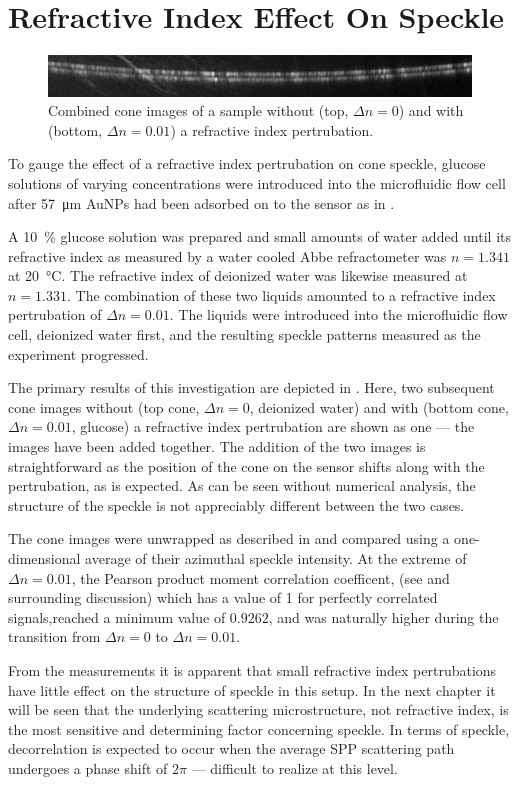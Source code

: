 \section{Refractive Index Effect On Speckle}
\begin{figure}[ht]
\centering
\includegraphics[keepaspectratio,width=15cm]{bulkri/figures/combineri.png}
\caption{Combined cone images of a sample without (top, $\Delta n = 0$) and
with (bottom, $\Delta n = 0.01$) a refractive index pertrubation. }
\label{fig:speckleridrangos}
\end{figure}

To gauge the effect of a refractive index pertrubation on cone speckle,
glucose solutions of varying concentrations were introduced into the
microfluidic flow cell after \SI{57}{\micro\meter} AuNPs had been adsorbed on
to the sensor as in .

A \SI{10}{\percent} glucose solution was prepared and small amounts of water
added until its refractive index as measured by a water cooled Abbe
refractometer was $n=1.341$ at \SI{20}{\celsius}.  The refractive index of
deionized water was likewise measured at $n=1.331$.  The combination of these
two liquids amounted to a refractive index pertrubation of $\Delta n = 0.01$.
The liquids were introduced into the microfluidic flow cell, deionized water
first, and the resulting speckle patterns measured as the experiment
progressed.

The primary results of this investigation are depicted in
.  Here, two subsequent cone images without (top
cone, $\Delta n = 0$, deionized water) and with (bottom cone, $\Delta n =
0.01$, glucose) a refractive index pertrubation are shown as one --- the
images have been added together.  The addition of the two images is
straightforward as the position of the cone on the sensor shifts along with
the pertrubation, as is expected.  As can be seen without numerical analysis,
the structure of the speckle is not appreciably different between the two
cases.

The cone images were unwrapped as described in  and
compared using a one-dimensional average of their azimuthal speckle intensity.
At the extreme of $\Delta n = 0.01$, the Pearson product moment correlation
coefficent, (see  and surrounding
discussion) which has a value of 1 for perfectly correlated signals,reached a
minimum value of $0.9262$, and was naturally higher during the transition from
$\Delta n = 0$ to $\Delta n = 0.01$.

From the measurements it is apparent that small refractive index pertrubations
have little effect on the structure of speckle in this setup.  In the next
chapter it will be seen that the underlying scattering microstructure, not
refractive index, is the most sensitive and determining factor concerning
speckle.  In terms of speckle, decorrelation is expected to occur when the
average SPP scattering path undergoes a phase shift of $2\pi$ --- difficult to
realize at this level.

